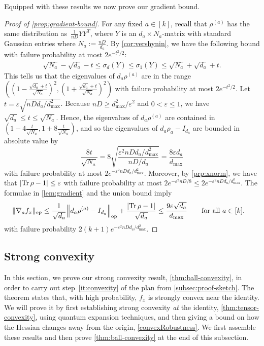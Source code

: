 \documentclass[aos]{imsart}
\theoremstyle{definition}
\numberwithin{equation}{section}
\DeclareMathOperator{\op}{op}
\DeclareMathOperator{\tr}{Tr}
\DeclarePairedDelimiter{\abs}{\lvert}{\rvert}
\DeclarePairedDelimiter{\norm}{\lVert}{\rVert}
\newcommand{\eps}{\varepsilon}
\def\dmax{d_{\max}}
\begin{document}
Equipped with these results we now prove our gradient bound.

\begin{proof}[Proof of \cref{prop:gradient-bound}]
For any fixed $a\in[k]$, recall that $\rho^{(a)}$ has the same distribution as~$\frac1{nD} YY^T$, where $Y$ is an $d_a\times N_a$-matrix with standard Gaussian entries where $N_{a} := \frac{nD}{d_{a}}$.
By \cref{cor:vershynin}, we have the following bound with failure probability at most $ 2 e^{-t^2/2}$:
\begin{align*}
  \sqrt{N_a} - \sqrt{d_a} - t \leq \sigma_d(Y) \leq \sigma_1(Y) \leq \sqrt{N_a} + \sqrt{d_a} + t.
\end{align*}
This tells us that the eigenvalues of $d_a \rho^{(a)}$ are in the range $( (1 - \frac{\sqrt{d_a} + t}{\sqrt{N_a}})^2, (1 + \frac{\sqrt{d_a} + t}{\sqrt{N_a}})^2)$ with failure probability at most $2 e^{-t^2/2}$. Let $t = \eps \sqrt{n D d_{a}/ \dmax^{2}}$. 
Because $nD \geq \dmax^{2}/\eps^{2}$ and $0 < \eps \leq 1$, we have $\sqrt{d_{a}} \leq t \leq \sqrt{N_a}$. 
Hence, the eigenvalues of $d_a \rho^{(a)}$ are contained in $( 1 - 4\frac{t}{\sqrt{N_a}}, 1 + 8 \frac{ t}{\sqrt{N_a}})$, and so the eigenvalues of $d_{a} \rho_{a} - I_{d_{a}}$ are bounded in absolute value by 
\[ \frac{8t}{\sqrt{N_{a}}} = 8 \sqrt{ \frac{\eps^{2} nD d_{a}/ \dmax^{2}}{nD / d_{a}} }
=  \frac{8\eps d_{a}}{\dmax}  \]
with failure probability at most $2e^{-\eps^{2} n D d_{a}/ \dmax^{2}}$. 
Moreover, by \cref{prp:xnorm}, we have that $\abs{\tr \rho - 1} \leq \eps$ with failure probability at most $ 2e^{-\eps^2 nD/8} \leq 2e^{-\eps^{2} n D d_{a}/ \dmax^{2}}$. 
The formulae in \cref{lem:gradient} and the union bound imply
\begin{align*}
  \norm{\nabla_a f_x}_{\op}
&\leq\frac{1}{\sqrt{d_a}} \norm*{d_{a} \rho^{(a)} - I_{d_a}}_{\op} + \frac{\abs{\tr\rho - 1}}{\sqrt{d_a}}
\leq \frac{9\eps \sqrt{d_{a}} }{\dmax} \qquad \text{for all } a\in[k].
\end{align*}
with failure probability $2 (k+1) e^{-\eps^{2} n D d_{a}/ \dmax^{2}}$.
\end{proof}

\subsection{Strong convexity}\label{subsec:strong-convex}
In this section, we prove our strong convexity result, \cref{thm:ball-convexity}, in order to carry out step~\ref{it:convexity} of the plan from \cref{subsec:proof-sketch}.
The theorem states that, with high probability, $f_x$ is strongly convex near the identity.
We will prove it by first establishing strong convexity \emph{at} the identity, \cref{thm:tensor-convexity}, using quantum expansion techniques, and then giving a bound on how the Hessian changes away from the origin, \cref{convexRobustness}.
We first assemble these results and then prove \cref{thm:ball-convexity} at the end of this subsection.
\end{document}
